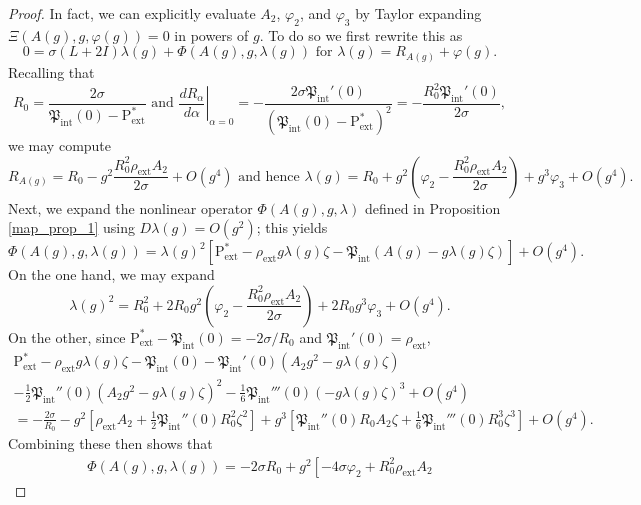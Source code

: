 \documentclass[11pt,reqno]{amsart}
\numberwithin{equation}{section}
\def\hal{\frac{1}{2}}
\def\hal{\frac{1}{2}}
\newcommand{\m}{\mathrm}
\def\pfint{\mathfrak{P}_{\m{int}}}
\def\pext{\m{P}_{\m{ext}}}
\begin{document}
\begin{proof}
In fact, we can explicitly evaluate $A_2$, $\varphi_2$, and $\varphi_3$ by Taylor expanding  $\Xi(A(g), g, \varphi(g)) = 0$ in powers of $g$.  To do so we first rewrite this as 
\begin{equation}
 0 = \sigma (L +2 I) \lambda(g) + \Phi(A(g), g, \lambda(g)) \text{ for } \lambda(g) = R_{A(g)} + \varphi(g).
\end{equation}
Recalling that
\begin{equation}
R_0 = \frac{2\sigma}{\pfint(0) - \pext^\ast} \text{ and }  \left. \frac{d R_\alpha}{d\alpha} \right|_{\alpha=0} = -\frac{2\sigma \pfint'(0)}{(\pfint(0) - \pext^\ast)^2} = -\frac{R_0^2 \pfint'(0)}{2\sigma},
\end{equation}
we may compute 
\begin{equation}
 R_{A(g)} = R_0 - g^2 \frac{R_0^2 \rho_{\m{ext}} A_2}{2\sigma} + O(g^4) \text{ and hence } \lambda(g) = R_0 + g^2\left( \varphi_2 - \frac{R_0^2 \rho_{\m{ext}} A_2}{2\sigma} \right) + g^3\varphi_3 + O(g^4).
\end{equation}
Next, we expand the nonlinear operator $\Phi(A(g), g, \lambda)$ defined in Proposition \ref{map_prop_1} using $D\lambda(g) = O(g^2)$; this yields
\begin{equation} 
\Phi(A(g), g, \lambda(g)) = \lambda(g)^2 \left[ \pext^\ast - \rho_{\m{ext}} g \lambda(g) \zeta - \pfint(A(g) - g \lambda(g) \zeta) \right] + O(g^4).
\end{equation}
On the one hand, we may expand 
\begin{equation}
 \lambda(g)^2 = R_0^2 + 2R_0 g^2\left( \varphi_2 - \frac{R_0^2 \rho_{\m{ext}} A_2}{2\sigma} \right) + 2R_0 g^3 \varphi_3 + O(g^4).
\end{equation}
On the other, since $\pext^\ast - \pfint(0) = -2\sigma/R_0$ and $\pfint'(0) = \rho_{\m{ext}}$,
\begin{multline}
\pext^\ast - \rho_{\m{ext}}g\lambda(g) \zeta   -\pfint(0) - \pfint'(0)(A_2 g^2 - g\lambda(g)\zeta) \\
- \hal\pfint''(0)(A_2 g^2 - g\lambda(g)\zeta)^2 
- \frac{1}{6}\pfint'''(0)(-g\lambda(g)\zeta)^3 + O(g^4)  \\
= -\frac{2\sigma}{R_0} - g^2 \left[ \rho_{\m{ext}} A_2 + \hal \pfint''(0) R_0^2 \zeta^2 \right] + g^3 \left[ \pfint''(0) R_0 A_2 \zeta + \frac{1}{6} \pfint'''(0) R_0^3 \zeta^3 \right] + O(g^4).
\end{multline}
Combining these then shows that 
\begin{multline}
 \Phi(A(g), g, \lambda(g)) = -2 \sigma R_0 + g^2 \left[-4 \sigma \varphi_2 + R_0^2 \rho_{\m{ext}} A_2

\end{multline}
\end{proof}
\end{document}
